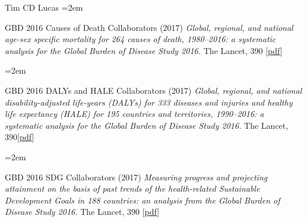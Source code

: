 \documentclass{scrartcl}
\newcommand{\Description}[1]{\hangindent=2em\hangafter=0\noindent\raggedright\footnotesize{#1}\par\normalsize\vspace{1em}} %
\begin{document}
\begin{cv}{Tim {\Large CD} Lucas}
\Description{GBD 2016 Causes of Death Collaborators (2017) \emph{Global, regional, and national age-sex specific mortality for 264 causes of death, 1980--2016: a systematic analysis for the Global Burden of Disease Study 2016.} The Lancet, 390 [\href{https://www.thelancet.com/action/showPdf?pii=S0140-6736\%2817\%2932152-9}{pdf}]}

\Description{GBD 2016 DALYs and HALE Collaborators (2017) \emph{Global, regional, and national disability-adjusted life-years (DALYs) for 333 diseases and injuries and healthy life expectancy (HALE) for 195 countries and territories, 1990--2016: a systematic analysis for the Global Burden of Disease Study 2016.} The Lancet, 390[\href{https://www.thelancet.com/action/showPdf?pii=S0140-6736\%2817\%2932130-X}{pdf}]}

\Description{GBD 2016 SDG Collaborators (2017) \emph{Measuring progress and projecting attainment on the basis of past trends of the health-related Sustainable Development Goals in 188 countries: an analysis from the Global Burden of Disease Study 2016.} The Lancet, 390 [\href{https://www.thelancet.com/action/showPdf?pii=S0140-6736\%2817\%2932336-X}{pdf}]}



\end{cv}
\end{document}
